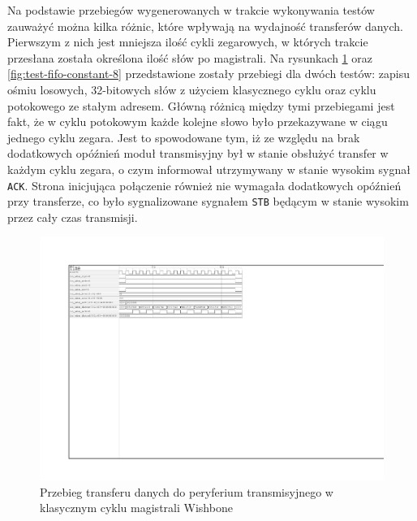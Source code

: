 Na podstawie przebiegów wygenerowanych w trakcie wykonywania testów zauważyć można kilka różnic, które wpływają na wydajność transferów danych. Pierwszym z nich jest mniejsza ilość cykli zegarowych, w których trakcie przesłana została określona ilość słów po magistrali.
Na rysunkach \ref{fig:test-fifo-classic-8} oraz \ref{fig:test-fifo-constant-8} przedstawione zostały przebiegi dla dwóch testów: zapisu ośmiu losowych, 32-bitowych słów z użyciem klasycznego cyklu oraz cyklu potokowego ze stałym adresem. Główną różnicą między tymi przebiegami jest fakt, że w cyklu potokowym każde kolejne słowo było przekazywane w ciągu jednego cyklu zegara. Jest to spowodowane tym, iż ze względu na brak dodatkowych opóźnień moduł transmisyjny był w stanie obsłużyć transfer w każdym cyklu zegara, o czym informował utrzymywany w stanie wysokim sygnał \texttt{ACK}. Strona inicjująca połączenie również nie wymagała dodatkowych opóźnień przy transferze, co było sygnalizowane sygnałem \texttt{STB} będącym w stanie wysokim przez cały czas transmisji.

\begin{figure}[H]
	\centering
	\includegraphics[scale=1,trim={2.54cm 14cm 12.3cm 2.9cm},clip]{testing/test-fifo-classic-8.pdf}
	\caption{Przebieg transferu danych do peryferium transmisyjnego w klasycznym cyklu magistrali Wishbone}
	\label{fig:test-fifo-classic-8}
\end{figure}

